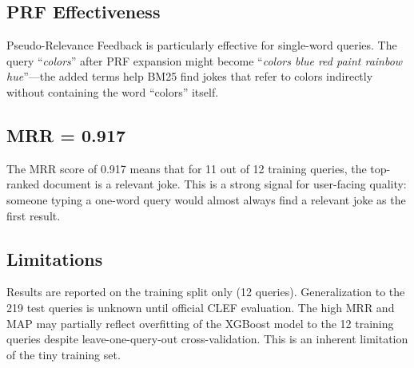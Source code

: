 \subsection{PRF Effectiveness}

Pseudo-Relevance Feedback is particularly effective for single-word queries. The query ``\textit{colors}'' after PRF expansion might become ``\textit{colors blue red paint rainbow hue}''---the added terms help BM25 find jokes that refer to colors indirectly without containing the word ``colors'' itself.

\subsection{MRR = 0.917}

The MRR score of 0.917 means that for 11 out of 12 training queries, the top-ranked document is a relevant joke. This is a strong signal for user-facing quality: someone typing a one-word query would almost always find a relevant joke as the first result.

\subsection{Limitations}

Results are reported on the training split only (12 queries). Generalization to the 219 test queries is unknown until official CLEF evaluation. The high MRR and MAP may partially reflect overfitting of the XGBoost model to the 12 training queries despite leave-one-query-out cross-validation. This is an inherent limitation of the tiny training set.
